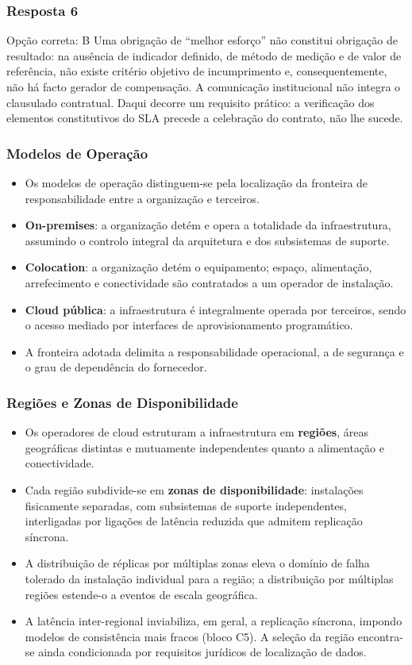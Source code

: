\documentclass[aspectratio=169]{beamer}
\begin{document}
\begin{frame}
\frametitle{Resposta 6}
\begin{resposta}{Opção correta: B}
Uma obrigação de \enquote{melhor esforço} não constitui obrigação de resultado: na ausência de indicador definido, de método de medição e de valor de referência, não existe critério objetivo de incumprimento e, consequentemente, não há facto gerador de compensação. A comunicação institucional não integra o clausulado contratual. Daqui decorre um requisito prático: a verificação dos elementos constitutivos do SLA precede a celebração do contrato, não lhe sucede.
\end{resposta}
\end{frame}

\begin{frame}
\frametitle{Modelos de Operação}
\begin{itemize}
    \setlength\itemsep{0.35cm}
    \item Os modelos de operação distinguem-se pela localização da fronteira de responsabilidade entre a organização e terceiros.
    \item \textbf{On-premises}: a organização detém e opera a totalidade da infraestrutura, assumindo o controlo integral da arquitetura e dos subsistemas de suporte.
    \item \textbf{Colocation}: a organização detém o equipamento; espaço, alimentação, arrefecimento e conectividade são contratados a um operador de instalação.
    \item \textbf{Cloud pública}: a infraestrutura é integralmente operada por terceiros, sendo o acesso mediado por interfaces de aprovisionamento programático.
    \item A fronteira adotada delimita a responsabilidade operacional, a de segurança e o grau de dependência do fornecedor.
\end{itemize}
\end{frame}

\begin{frame}
\frametitle{Regiões e Zonas de Disponibilidade}
\begin{itemize}
    \setlength\itemsep{0.35cm}
    \item Os operadores de cloud estruturam a infraestrutura em \textbf{regiões}, áreas geográficas distintas e mutuamente independentes quanto a alimentação e conectividade.
    \item Cada região subdivide-se em \textbf{zonas de disponibilidade}: instalações fisicamente separadas, com subsistemas de suporte independentes, interligadas por ligações de latência reduzida que admitem replicação síncrona.
    \item A distribuição de réplicas por múltiplas zonas eleva o domínio de falha tolerado da instalação individual para a região; a distribuição por múltiplas regiões estende-o a eventos de escala geográfica.
    \item A latência inter-regional inviabiliza, em geral, a replicação síncrona, impondo modelos de consistência mais fracos (bloco C5). A seleção da região encontra-se ainda condicionada por requisitos jurídicos de localização de dados.
\end{itemize}
\end{frame}
\end{document}
